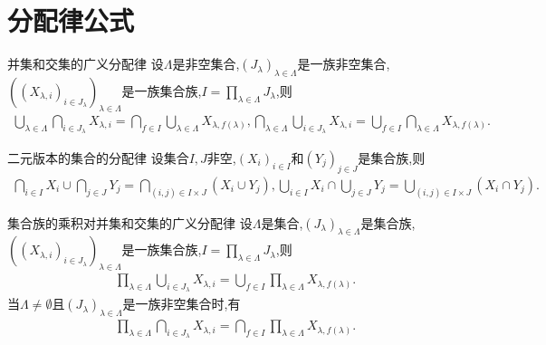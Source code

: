 \section{分配律公式}

\begin{proposition}{并集和交集的广义分配律}{}
	设$\Lambda$是非空集合,$\left(J_{\lambda}\right)_{\lambda\in\Lambda}$是一族非空集合,$\left(\left(X_{\lambda,i}\right)_{i\in J_{\lambda}}\right)_{\lambda\in\Lambda}$是一族集合族,$I=\prod\limits_{\lambda\in\Lambda}J_{\lambda}$,则
	\begin{align*}
		\bigcup\limits_{\lambda\in\Lambda}\bigcap\limits_{i\in J_{\lambda}}X_{\lambda,i}=\bigcap\limits_{f\in I}\bigcup\limits_{\lambda\in\Lambda}X_{\lambda,f\left(\lambda\right)},\bigcap\limits_{\lambda\in\Lambda}\bigcup\limits_{i\in J_{\lambda}}X_{\lambda,i}=\bigcup\limits_{f\in I}\bigcap\limits_{\lambda\in\Lambda}X_{\lambda,f\left(\lambda\right)}.
	\end{align*}
\end{proposition}

\begin{corollary}{二元版本的集合的分配律}{}
	设集合$I,J$非空,$\left(X_{i}\right)_{i\in I}$和$\left(Y_{j}\right)_{j\in J}$是集合族,则
	\begin{align*}
		\bigcap\limits_{i\in I}X_{i}\cup\bigcap\limits_{j\in J}Y_{j}=\bigcap\limits_{\left(i,j\right)\in I\times J}\left(X_{i}\cup Y_{j}\right),\bigcup\limits_{i\in I}X_{i}\cap\bigcup\limits_{j\in J}Y_{j}=\bigcup\limits_{\left(i,j\right)\in I\times J}\left(X_{i}\cap Y_{j}\right).
	\end{align*}
\end{corollary}

\begin{proposition}{集合族的乘积对并集和交集的广义分配律}{}
	设$\Lambda$是集合,$\left(J_{\lambda}\right)_{\lambda\in\Lambda}$是集合族,$\left(\left(X_{\lambda,i}\right)_{i\in J_{\lambda}}\right)_{\lambda\in\Lambda}$是一族集合族,$I=\prod\limits_{\lambda\in\Lambda}J_{\lambda}$,则
	\begin{align*}
		\prod\limits_{\lambda\in\Lambda}\bigcup\limits_{i\in J_{\lambda}}X_{\lambda,i}=\bigcup\limits_{f\in I}\prod\limits_{\lambda\in\Lambda}X_{\lambda,f\left(\lambda\right)}.
	\end{align*}
	当$\Lambda\neq\emptyset$且$\left(J_{\lambda}\right)_{\lambda\in\Lambda}$是一族非空集合时,有
	\begin{align*}
		\prod\limits_{\lambda\in\Lambda}\bigcap\limits_{i\in J_{\lambda}}X_{\lambda,i}=\bigcap\limits_{f\in I}\prod\limits_{\lambda\in\Lambda}X_{\lambda,f\left(\lambda\right)}.
	\end{align*}
\end{proposition}

